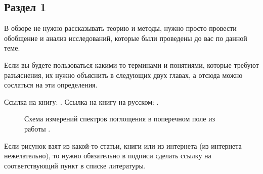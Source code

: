 \documentclass[a4paper,14pt]{extarticle}
\begin{document}
\subsection{Раздел 1}

В обзоре не нужно рассказывать теорию и методы, нужно просто провести обобщение и анализ исследований, которые были проведены до вас по данной теме.

Если вы будете пользоваться какими-то терминами и понятиями, которые требуют разъяснения, их нужно объяснить в следующих двух главах, а отсюда можно сослаться на эти определения.

Ссылка на книгу: \cite{datta1}.
Ссылка на книгу на русском: \cite{fedotkin1}.

\begin{figure}[ht]
    \begin{center}
    
    \caption{\label{fig:miller2-2}
        Схема измерений спектров поглощения в поперечном поле из работы \cite{miller1}.}
    \end {center}
    \end {figure}
    
    Если рисунок взят из какой-то статьи, книги или из интернета (из интернета нежелательно), то нужно обязательно в подписи сделать ссылку на соответствующий пункт в списке литературы.
\end{document}
